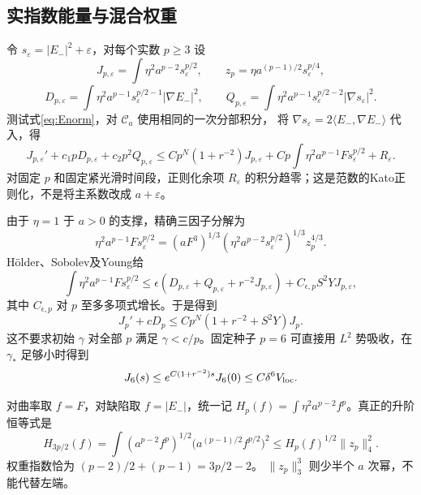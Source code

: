 \documentclass[UTF8,a4paper,11pt,fontset=fandol]{ctexart}
\numberwithin{equation}{section}
\theoremstyle{definition}
\begin{document}
\subsection{实指数能量与混合权重}
令 $s_\varepsilon=|E_-|^2+\varepsilon$，对每个实数 $p\ge3$ 设
\[
J_{p,\varepsilon}=\int\eta^2a^{p-2}s_\varepsilon^{p/2},\qquad
z_p=\eta a^{(p-1)/2}s_\varepsilon^{p/4},
\]
\[
D_{p,\varepsilon}=\int\eta^2a^{p-1}s_\varepsilon^{p/2-1}|\nabla E_-|^2,\qquad
Q_{p,\varepsilon}=\int\eta^2a^{p-1}s_\varepsilon^{p/2-2}|\nabla s_\varepsilon|^2.
\]
测试式\eqref{eq:Enorm}，对 $\mathcal C_a$ 使用相同的一次分部积分，
将 $\nabla s_\varepsilon=2\langle E_-,\nabla E_-\rangle$ 代入，得
\[
J_{p,\varepsilon}'+c_1pD_{p,\varepsilon}+c_2p^2Q_{p,\varepsilon}
\le Cp^N(1+r^{-2})J_{p,\varepsilon}
+Cp\int\eta^2a^{p-1}F s_\varepsilon^{p/2}+R_\varepsilon.
\]
对固定 $p$ 和固定紧光滑时间段，正则化余项 $R_\varepsilon$ 的积分趋零；这是范数的Kato正则化，不是将主系数改成 $a+\varepsilon$。

由于 $\eta=1$ 于 $a>0$ 的支撑，精确三因子分解为
\[
\eta^2a^{p-1}F s_\varepsilon^{p/2}
=(aF^3)^{1/3}
(\eta^2a^{p-2}s_\varepsilon^{p/2})^{1/3}z_p^{4/3}.
\]
H\"older、Sobolev及Young给
\[
\int\eta^2a^{p-1}F s_\varepsilon^{p/2}
\le\epsilon(D_{p,\varepsilon}+Q_{p,\varepsilon}+r^{-2}J_{p,\varepsilon})
+C_{\epsilon,p}S^2YJ_{p,\varepsilon},
\]
其中 $C_{\epsilon,p}$ 对 $p$ 至多多项式增长。于是得到
\begin{equation}\label{eq:realp}
J_p'+cD_p\le Cp^N(1+r^{-2}+S^2Y)J_p.
\end{equation}
这不要求初始 $\gamma$ 对全部 $p$ 满足 $\gamma<c/p$。固定种子 $p=6$ 可直接用 $L^2$ 势吸收，在 $\gamma_*$ 足够小时得到
\[
J_6(s)\le e^{C(1+r^{-2})s}J_6(0)
\le C\delta^6V_{\rm loc}.
\]

对曲率取 $f=F$，对缺陷取 $f=|E_-|$，统一记
$H_p(f)=\int\eta^2a^{p-2}f^p$。真正的升阶恒等式是
\begin{equation}\label{eq:mixed-recurrence}
H_{3p/2}(f)
=\int(a^{p-2}f^p)^{1/2}
\bigl(a^{(p-1)/2}f^{p/2}\bigr)^2
\le H_p(f)^{1/2}\|z_p\|_4^2.
\end{equation}
权重指数恰为 $(p-2)/2+(p-1)=3p/2-2$。
$\|z_p\|_3^3$ 则少半个 $a$ 次幂，不能代替左端。
\end{document}
